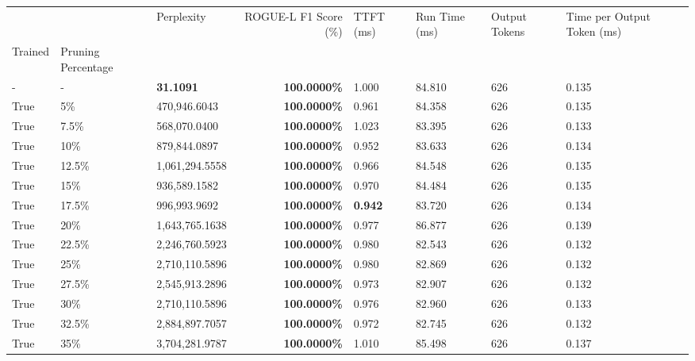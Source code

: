 \begin{table}[H]
\label{tab:evaluation-pipeline-5}
\begin{tabular}{lllrllll}
\toprule
 &  & Perplexity & ROGUE-L F1 Score (\%) & TTFT (ms) & Run Time (ms) & Output Tokens & Time per Output Token (ms) \\
Trained & Pruning Percentage &  &  &  &  &  &  \\
\midrule
- & - & \bfseries 31.1091 & \bfseries 100.0000\% & 1.000 & 84.810 & 626 & 0.135 \\
\cline{1-8} \cline{2-8}
True & 5\% & 470,946.6043 & \bfseries \color{red} 100.0000\% & 0.961 & 84.358 & 626 & 0.135 \\
\cline{1-8} \cline{2-8}
True & 7.5\% & 568,070.0400 & \bfseries \color{red} 100.0000\% & 1.023 & 83.395 & 626 & 0.133 \\
\cline{1-8} \cline{2-8}
True & 10\% & 879,844.0897 & \bfseries \color{red} 100.0000\% & 0.952 & 83.633 & 626 & 0.134 \\
\cline{1-8} \cline{2-8}
True & 12.5\% & 1,061,294.5558 & \bfseries \color{red} 100.0000\% & 0.966 & 84.548 & 626 & 0.135 \\
\cline{1-8} \cline{2-8}
True & 15\% & 936,589.1582 & \bfseries \color{red} 100.0000\% & 0.970 & 84.484 & 626 & 0.135 \\
\cline{1-8} \cline{2-8}
True & 17.5\% & 996,993.9692 & \bfseries \color{red} 100.0000\% & \bfseries \color{red} 0.942 & 83.720 & 626 & 0.134 \\
\cline{1-8} \cline{2-8}
True & 20\% & 1,643,765.1638 & \bfseries \color{red} 100.0000\% & 0.977 & 86.877 & 626 & 0.139 \\
\cline{1-8} \cline{2-8}
True & 22.5\% & 2,246,760.5923 & \bfseries \color{red} 100.0000\% & 0.980 & 82.543 & 626 & 0.132 \\
\cline{1-8} \cline{2-8}
True & 25\% & 2,710,110.5896 & \bfseries \color{red} 100.0000\% & 0.980 & 82.869 & 626 & 0.132 \\
\cline{1-8} \cline{2-8}
True & 27.5\% & 2,545,913.2896 & \bfseries \color{red} 100.0000\% & 0.973 & 82.907 & 626 & 0.132 \\
\cline{1-8} \cline{2-8}
True & 30\% & 2,710,110.5896 & \bfseries \color{red} 100.0000\% & 0.976 & 82.960 & 626 & 0.133 \\
\cline{1-8} \cline{2-8}
True & 32.5\% & 2,884,897.7057 & \bfseries \color{red} 100.0000\% & 0.972 & 82.745 & 626 & 0.132 \\
\cline{1-8} \cline{2-8}
True & 35\% & 3,704,281.9787 & \bfseries \color{red} 100.0000\% & 1.010 & 85.498 & 626 & 0.137 \\

\end{tabular}
\end{table}
